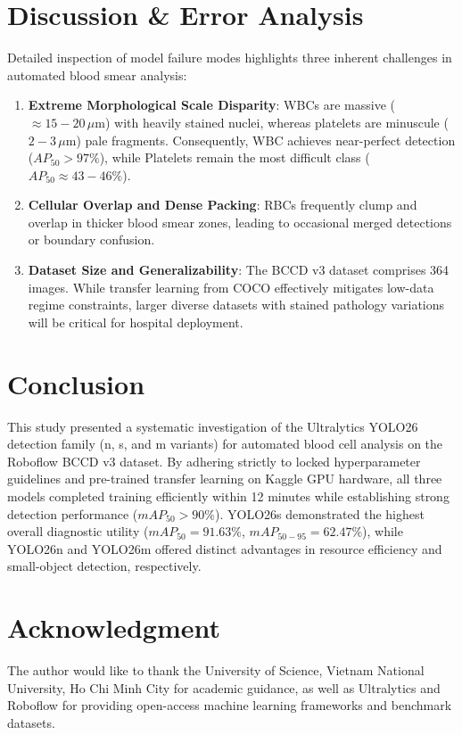 \documentclass[conference]{IEEEtran}
\begin{document}
\section{Discussion \& Error Analysis}
Detailed inspection of model failure modes highlights three inherent challenges in automated blood smear analysis:
\begin{enumerate}
    \item \textbf{Extreme Morphological Scale Disparity}: WBCs are massive ($\approx 15-20\,\mu\text{m}$) with heavily stained nuclei, whereas platelets are minuscule ($2-3\,\mu\text{m}$) pale fragments. Consequently, WBC achieves near-perfect detection ($AP_{50} > 97\%$), while Platelets remain the most difficult class ($AP_{50} \approx 43-46\%$).
    \item \textbf{Cellular Overlap and Dense Packing}: RBCs frequently clump and overlap in thicker blood smear zones, leading to occasional merged detections or boundary confusion.
    \item \textbf{Dataset Size and Generalizability}: The BCCD v3 dataset comprises 364 images. While transfer learning from COCO effectively mitigates low-data regime constraints, larger diverse datasets with stained pathology variations will be critical for hospital deployment.
\end{enumerate}

\section{Conclusion}
This study presented a systematic investigation of the Ultralytics YOLO26 detection family (n, s, and m variants) for automated blood cell analysis on the Roboflow BCCD v3 dataset. By adhering strictly to locked hyperparameter guidelines and pre-trained transfer learning on Kaggle GPU hardware, all three models completed training efficiently within 12 minutes while establishing strong detection performance ($mAP_{50} > 90\%$). YOLO26s demonstrated the highest overall diagnostic utility ($mAP_{50} = 91.63\%$, $mAP_{50-95} = 62.47\%$), while YOLO26n and YOLO26m offered distinct advantages in resource efficiency and small-object detection, respectively.

\section*{Acknowledgment}
The author would like to thank the University of Science, Vietnam National University, Ho Chi Minh City for academic guidance, as well as Ultralytics and Roboflow for providing open-access machine learning frameworks and benchmark datasets.
\end{document}
